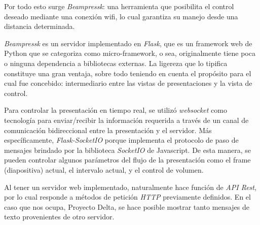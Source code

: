 	Por todo esto surge \textit{Beampressk}: una herramienta que posibilita el control deseado mediante una conexión wifi, lo cual garantiza su manejo desde una distancia determinada.

	\textit{Beampressk} es un servidor implementado en \textit{Flask}, que es un framework web de Python que se categoriza como micro-framework, o sea, originalmente tiene poca o ninguna dependencia a bibliotecas externas. La ligereza que lo tipifica constituye una gran ventaja, sobre todo teniendo en cuenta el propósito para el cual fue concebido: intermediario entre las vistas de presentaciones y la vista de control.

	Para controlar la presentación en tiempo real, se utilizó \textit{websocket} como tecnología para enviar/recibir la información requerida a través de un canal de comunicación bidireccional entre la presentación y el servidor. Más específicamente, \textit{Flask-SocketIO} porque implementa el protocolo de paso de mensajes brindado por la biblioteca \textit{SocketIO} de Javascript. De esta manera, se pueden controlar algunos parámetros del flujo de la presentación como el frame (diapositiva) actual, el intervalo actual, y el control de volumen.

	Al tener un servidor web implementado, naturalmente hace función de \textit{API Rest}, por lo cual responde a métodos de petición \textit{HTTP} previamente definidos. En el caso que nos ocupa, Proyecto Delta, se hace posible mostrar tanto mensajes de texto provenientes de otro servidor.




